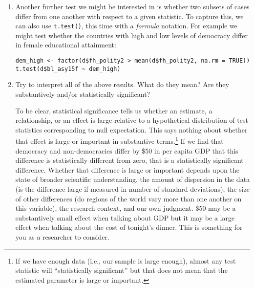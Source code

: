 \documentclass[a4paper,12pt]{article}
\begin{document}
\begin{enumerate}
\item Another further test we might be interested in is whether two subsets of cases differ from one another with respect to a given statistic. To capture this, we can also use \texttt{t.test()}, this time with a \textit{formula} notation. For example we might test whether the countries with high and low levels of democracy differ in female educational attainment:

\begin{verbatim}
dem_high <- factor(d$fh_polity2 > mean(d$fh_polity2, na.rm = TRUE))
t.test(d$bl_asy15f ~ dem_high)
\end{verbatim}

\item Try to interpret all of the above results. What do they mean? Are they substantively and/or statistically significant?

\vspace{4em}

\noindent To be clear, statistical significance tells us whether an estimate, a relationship, or an effect is large relative to a hypothetical distribution of test statistics corresponding to null expectation. This says nothing about whether that effect is large or important in substantive terms.\footnote{If we have enough data (i.e., our sample is large enough), almost any test statistic will ``statistically significant'' but that does not mean that the estimated parameter is large or important.} If we find that democracy and non-democracies differ by \$50 in per capita GDP that this difference is statistically different from zero, that is a statistically significant difference. Whether that difference is large or important depends upon the state of broader scientific understanding, the amount of dispersion in the data (is the difference large if measured in number of standard deviations), the size of other differences (do regions of the world vary more than one another on this variable), the research context, and our own judgment. \$50 may be a substantively small effect when talking about GDP but it may be a large effect when talking about the cost of tonight's dinner. This is something for you as a researcher to consider.

\end{enumerate}
\end{document}
